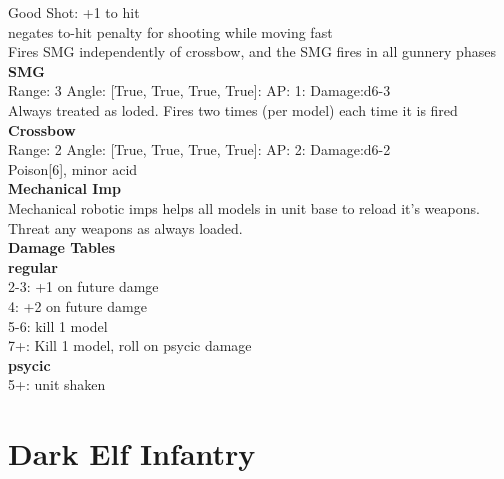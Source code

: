 Good Shot: +1 to hit\\ 
negates to-hit penalty for shooting while moving fast\\ 
Fires SMG independently of crossbow, and the SMG fires in all gunnery phases\\ 


{\bf SMG } \\



Range: 3  Angle: [True, True, True, True]: AP: 1: Damage:d6-3 \\
Always treated as loded. Fires two times (per model) each time it is fired\\ 




{\bf Crossbow } \\



Range: 2  Angle: [True, True, True, True]: AP: 2: Damage:d6-2 \\
Poison[6], minor acid\\ 




{\bf Mechanical Imp } \\

Mechanical robotic imps helps all models in unit base to reload it's weapons. Threat any weapons as always loaded.\\ 





 





{\bf Damage Tables} \\
 {\bf regular } \\
2-3: +1 on future damge \\
4: +2 on future damge \\
5-6: kill 1 model \\
7+: Kill 1 model, roll on psycic damage \\
 {\bf psycic } \\
5+: unit shaken \\










\pagebreak\pagebreak

\section{ Dark Elf Infantry }

